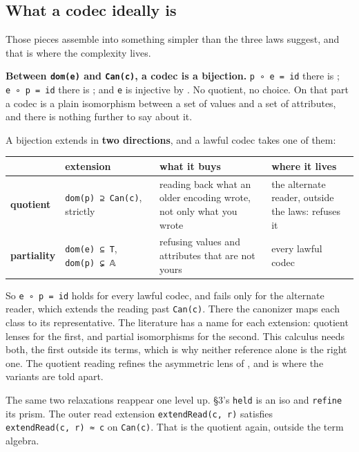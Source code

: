 \subsection{What a codec ideally is}\label{what-a-codec-ideally-is}

Those pieces assemble into something simpler than the three laws suggest, and that is where the
complexity lives.

\textbf{Between \texttt{dom(e)} and \texttt{Can(c)}, a codec is a bijection.} \texttt{p\ ∘\ e\ =\ id} there is ; \texttt{e\ ∘\ p\ =\ id}
there is ; and \texttt{e} is injective by . No quotient, no choice. On that part a
codec is a plain isomorphism between a set of values and a set of attributes, and there is nothing
further to say about it.

A bijection extends in \textbf{two directions}, and a lawful codec takes one of them:

\begin{tabular}{@{}llll@{}}
\toprule
& extension & what it buys & where it lives \\
\midrule
\textbf{quotient} & \texttt{dom(p)\ ⊇\ Can(c)}, strictly & reading back what an older encoding wrote, not only what you wrote & the alternate reader, outside the laws: {cond:C}{\textbf{(C)}} refuses it \\
\textbf{partiality} & \texttt{dom(e)\ ⊆\ T}, \texttt{dom(p)\ ⊊\ 𝔸} & refusing values and attributes that are not yours & every lawful codec \\
\bottomrule
\end{tabular}

So \texttt{e\ ∘\ p\ =\ id} holds for every lawful codec, and fails only for the alternate reader, which
extends the reading past \texttt{Can(c)}. There the canonizer maps each class to its representative. The
literature has a name for each extension: quotient lenses \cite{quotient-lenses} for the first, and
partial isomorphisms \cite{invertible-syntax} for the second. This calculus needs both, the
first outside its terms, which is why neither reference alone is the right one. The quotient
reading refines the asymmetric lens of \cite{tree-transformations}, and \cite{lens-laws} is where the
variants are told apart.

The same two relaxations reappear one level up. §3's \texttt{held} is an iso and
\texttt{refine} its prism. The outer read extension \texttt{extendRead(c,\ r)} satisfies
\texttt{extendRead(c,\ r)\ ≈\ c} on \texttt{Can(c)}. That is the quotient again, outside the term
algebra.

